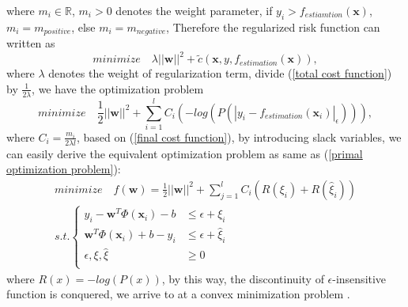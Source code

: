 \documentclass[12pt, draftclsnofoot, onecolumn]{IEEEtran}
\begin{document}
\begin{spacing}{2}
\begin{equation}
\label{cost function}
\end{equation}
where $m_{i}\in \mathbb{R}$, $m_{i}>0$ denotes the weight parameter, if $y_{i}>f_{estiamtion}(\mathbf{x})$, $m_{i}=m_{positive}$, else $m_{i}=m_{negative}$, Therefore the regularized risk function can written as 
\begin{equation}
minimize\quad \lambda||\mathbf{w}||^{2}+\tilde{c}(\mathbf{x}, y, f_{estimation}(\mathbf{x})),
\label{total cost function}
\end{equation} 
where $\lambda$ denotes the weight of regularization term, divide (\ref{total cost function}) by $\frac{1}{2\lambda}$, we have the optimization problem  
\begin{equation}
minimize \quad \frac{1}{2}||\mathbf{w}||^{2}+\sum_{i=1}^{l}C_{i}(-log(P(|y_{i}-f_{estimation}(\mathbf{x}_{i})|_{\epsilon}))),
\label{final cost function}
\end{equation}
where $C_{i}=\frac{m_{i}}{2\lambda l}$, based on (\ref{final cost function}), by introducing slack variables, we can easily derive the equivalent optimization problem as same as (\ref{primal optimization problem}):
\begin{eqnarray}
\nonumber
minimize \quad f(\mathbf{w})=\frac{1}{2}||\mathbf{w}||^{2}+\sum_{j=1}^{l}C_{i}(R(\xi_{i})+R(\hat{\xi}_{i}))\\
s.t. \left\{\begin{array}{ll}
y_{i}-\mathbf{w}^{T}\Phi(\mathbf{x}_{i})-b &\leq \epsilon+\xi_{i}\\
\mathbf{w}^{T}\Phi(\mathbf{x}_{i})+b-y_{i} &\leq \epsilon+\hat{\xi}_{i}\\
\epsilon, \xi,\hat{\xi} &\geq 0\\
\end{array}\right.
\label{primal objective function}
\end{eqnarray}
where $R(x)=-log(P(x))$, by this way, the discontinuity of $\epsilon$-insensitive function is conquered, we arrive to at a convex minimization problem \cite{smola and skpkof 1998a tutorial of SVR}. 

\end{spacing}
\end{document}
